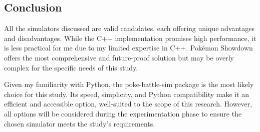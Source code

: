 \subsection{Conclusion}

All the simulators discussed are valid candidates, each offering unique advantages and disadvantages. While the C++ implementation promises high performance, it is less practical for me due to my limited expertise in C++. Pokémon Showdown offers the most comprehensive and future-proof solution but may be overly complex for the specific needs of this study.

Given my familiarity with Python, the poke-battle-sim package is the most likely choice for this study. Its speed, simplicity, and Python compatibility make it an efficient and accessible option, well-suited to the scope of this research. However, all options will be considered during the experimentation phase to ensure the chosen simulator meets the study's requirements.